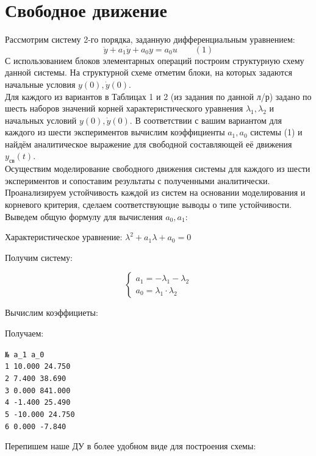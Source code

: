\section{Свободное движение}

Рассмотрим систему 2-го порядка, заданную дифференциальным уравнением:
\[
\ddot{y} + a_1 \dot{y} + a_0 y = a_0 u \qquad (1)
\]
С использованием блоков элементарных операций построим структурную схему данной системы. На структурной схеме отметим блоки, на которых задаются начальные условия $y(0), \dot{y}(0)$. \\
Для каждого из вариантов в Таблицах 1 и 2 (из задания по данной л/р) задано по шесть наборов значений корней характеристического уравнения $\lambda_1, \lambda_2$ и начальных условий $y(0), \dot{y}(0)$. В соответствии с вашим вариантом для каждого из шести экспериментов вычислим коэффициенты $a_1, a_0$ системы (1) и найдём аналитическое выражение для свободной составляющей её движения $y_{\text{св}}(t)$. \\
Осуществим моделирование свободного движения системы для каждого из шести экспериментов и сопоставим результаты с полученными аналитически. \\
Проанализируем устойчивость каждой из систем на основании моделирования и корневого критерия, сделаем соответствующие выводы о типе устойчивости.
\\

Выведем общую формулу для вычисления $a_0 ,a_1$:

Характеристическое уравнение: $\lambda^2 +a_1 \lambda +a_0 =0$

Получим систему:


\begin{par}
$$\left\lbrace \begin{array}{c}
a_1 =-\lambda_1 -\lambda_2 \\
a_0 =\lambda_1 \cdot \lambda_2 
\end{array}\right.$$
\end{par}


Вычислим коэффициеты:

Получаем:

\begin{par}
    \begin{flushleft}
\texttt{№  a\_1		 a\_0}\\
\texttt{1  10.000	 24.750}\\
\texttt{2   7.400	 38.690}\\
\texttt{3   0.000	841.000}\\
\texttt{4  -1.400	 25.490}\\
\texttt{5 -10.000	 24.750}\\
\texttt{6   0.000	 -7.840}\\
    \end{flushleft}
\end{par}
Перепишем наше ДУ в более удобном виде для построения схемы:

